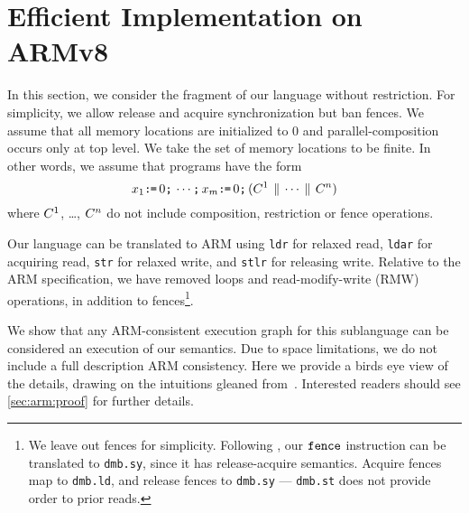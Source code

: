 \section{Efficient Implementation on ARMv8}
\label{sec:arm}

In this section, we consider the fragment of our language without
restriction.  For simplicity, we allow release and acquire synchronization
but ban fences.  We assume that all memory locations are initialized to $0$
and parallel-composition occurs only at top level.  We take the set of memory
locations to be finite.  In other words, we assume that programs have the
form
\begin{displaymath}
  {x_1}\texttt{:}\mkern-1mu\texttt{=}\,{0}\texttt{;}\,
  \cdots\texttt{;}\,
  {x_m}\texttt{:}\mkern-1mu\texttt{=}\,{0}\texttt{;}\,
  (C^1 \,\mathbin{\|}\, \cdots \,\mathbin{\|}\, C^n)
\end{displaymath}
where $C^1$, \ldots, $C^n$ do not include composition, restriction or
fence operations.

Our language can be translated to ARM using \texttt{ldr} for relaxed read,
\texttt{ldar} for acquiring read, \texttt{str} for relaxed write, and
\texttt{stlr} for releasing write.  Relative to the ARM specification, we
have removed loops and read-modify-write (RMW) operations, in addition to
fences\footnote{We leave out fences for simplicity.  Following
  \citet{DBLP:journals/pacmpl/PodkopaevLV19}, our $\texttt{fence}$ instruction can be
  translated to \texttt{dmb.sy}, since it has release-acquire semantics.
  Acquire fences map to \texttt{dmb.ld}, and release fences to
  \texttt{dmb.sy} --- \texttt{dmb.st} does not provide order to prior
  reads.}.

We show that any ARM-consistent execution graph for this sublanguage can be
considered an execution of our semantics.  
%
%
Due to space limitations, we do not include a full description ARM
consistency.  
Here we provide a birds eye view of the details, drawing on the intuitions gleaned from~\citep{DBLP:journals/pacmpl/PulteFDFSS18}.  
Interested readers should see \textsection\ref{sec:arm:proof}
for further details.

